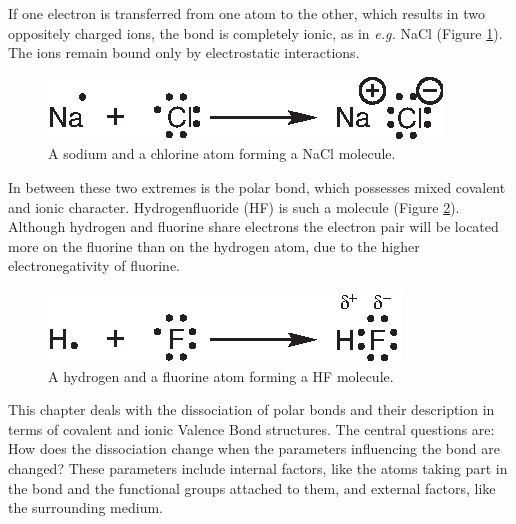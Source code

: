If one electron is transferred from one atom to the other, which results in two oppositely charged ions, the bond is completely ionic, as in \textit{e.g.} NaCl (Figure \ref{ch3.fig.nacl}). The ions remain bound only by electrostatic interactions. 
\begin{figure}[ht]
\center
\includegraphics{dissociation/figures/nacl.eps}
\caption{A sodium and a chlorine atom forming a NaCl molecule.}
\label{ch3.fig.nacl}
\end{figure}

In between these two extremes is the polar bond, which possesses mixed covalent and ionic character. Hydrogenfluoride (HF) is such a molecule (Figure \ref{ch3.fig.hf}). Although hydrogen and fluorine share electrons the electron pair will be located more on the fluorine than on the hydrogen atom, due to the higher electronegativity of fluorine.
\begin{figure}[ht]
\center
\includegraphics{dissociation/figures/hf.eps}
\caption{A hydrogen and a fluorine atom forming a HF molecule.}
\label{ch3.fig.hf}
\end{figure}

This chapter deals with the dissociation of polar bonds and their description in terms of covalent and ionic Valence Bond structures. The central questions are: How does the dissociation change when the parameters influencing the bond are changed? These parameters include internal factors, like the atoms taking part in the bond and the functional groups attached to them, and external factors, like the surrounding medium. 

